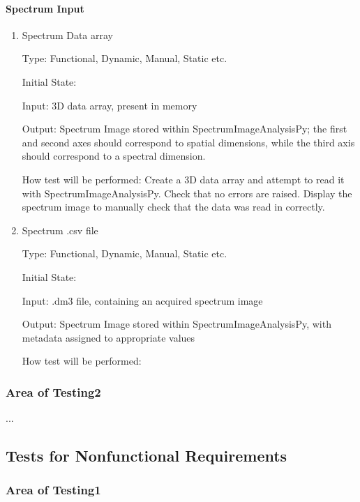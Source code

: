 \documentclass[12pt, titlepage]{article}
\newcommand{\progname}{SpectrumImageAnalysisPy}
\begin{document}
\paragraph{Spectrum Input}

\begin{enumerate}

\item{Spectrum Data array\\}

Type: Functional, Dynamic, Manual, Static etc.
					
Initial State: 
					
Input: 3D data array, present in memory
					
Output: Spectrum Image stored within \progname{}; the first and second axes should correspond to spatial dimensions, while the third axis should correspond to a spectral dimension.
					
How test will be performed: Create a 3D data array and attempt to read it with \progname{}. Check that no errors are raised. Display the spectrum image to manually check that the data was read in correctly.


\item{Spectrum .csv file\\}

Type: Functional, Dynamic, Manual, Static etc.

Initial State: 

Input: .dm3 file, containing an acquired spectrum image

Output: Spectrum Image stored within \progname{}, with metadata assigned to appropriate values

How test will be performed: 

\end{enumerate}


\subsubsection{Area of Testing2}

...

\subsection{Tests for Nonfunctional Requirements}

\subsubsection{Area of Testing1}
		
\end{document}
